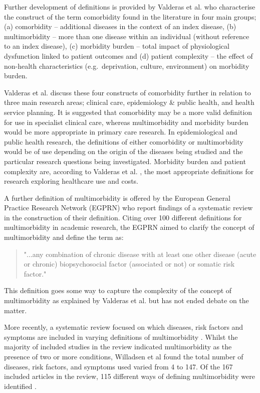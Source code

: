 \documentclass[12pt,]{report}
\begin{document}
Further development of definitions is provided by Valderas et al.
\citep{RN64} who characterise the construct of the term comorbidity
found in the literature in four main groups; (a) comorbidity --
additional diseases in the context of an index disease, (b)
multimorbidity -- more than one disease within an individual (without
reference to an index disease), (c) morbidity burden -- total impact of
physiological dysfunction linked to patient outcomes and (d) patient
complexity -- the effect of non-health characteristics
(e.g.~deprivation, culture, environment) on morbidity burden.

Valderas et al. \citep{RN64} discuss these four constructs of
comorbidity further in relation to three main research areas; clinical
care, epidemiology \& public health, and health service planning. It is
suggested that comorbidity may be a more valid definition for use in
specialist clinical care, whereas multimorbidity and morbidity burden
would be more appropriate in primary care research. In epidemiological
and public health research, the definitions of either comorbidity or
multimorbidity would be of use depending on the origin of the diseases
being studied and the particular research questions being investigated.
Morbidity burden and patient complexity are, according to Valderas et
al. \citep{RN64}, the most appropriate definitions for research
exploring healthcare use and costs.

A further definition of multimorbidity is offered by the European
General Practice Research Network (EGPRN) who report findings of a
systematic review in the construction of their definition. Citing over
100 different definitions for multimorbidity in academic research, the
EGPRN \citep[pp.1]{RN77} aimed to clarify the concept of multimorbidity
and define the term as:

\begin{quotation} "...any combination of chronic disease with at least one other disease (acute or chronic) biopsychosocial factor (associated or not) or somatic risk factor." \end{quotation}

This definition goes some way to capture the complexity of the concept
of multimorbidity as explained by Valderas et al. \citeyearpar{RN64} but
has not ended debate on the matter.

More recently, a systematic review focused on which diseases, risk
factors and symptoms are included in varying definitions of
multimorbidity \citep{RN254}. Whilst the majority of included studies in
the review indicated multimorbidity as the presence of two or more
conditions, Willadsen et al \citeyearpar{RN254} found the total number
of diseases, risk factors, and symptoms used varied from 4 to 147. Of
the 167 included articles in the review, 115 different ways of defining
multimorbidity were identified \citep{RN254}.
\end{document}
